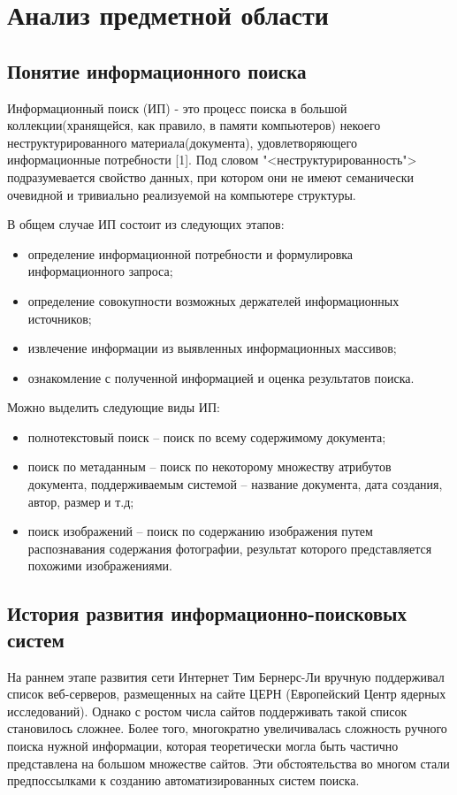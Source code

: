 \section{Анализ предметной области}
\subsection{Понятие информационного поиска}

Информационный поиск (ИП) - это процесс поиска в большой коллекции(хранящейся, как правило, в памяти компьютеров) некоего неструктурированного материала(документа), удовлетворяющего информационные потребности [1]. Под словом "<неструктурированность"> подразумевается свойство данных, при котором они не имеют семанически очевидной и тривиально реализуемой на компьютере структуры.

В общем случае ИП состоит из следующих этапов:
\begin{itemize}
\item определение информационной потребности и формулировка информационного запроса;
\item определение совокупности возможных держателей информационных источников;
\item извлечение информации из выявленных информационных массивов;
\item ознакомление с полученной информацией и оценка результатов поиска.
\end{itemize}

Можно выделить следующие виды ИП:
\begin{itemize}
\item полнотекстовый поиск -- поиск по всему содержимому документа;
\item поиск по метаданным -- поиск по некоторому множеству атрибутов документа, поддерживаемым системой -- название документа, дата создания, автор, размер и т.д;
\item поиск изображений -- поиск по содержанию изображения путем распознавания содержания фотографии, результат которого представляется похожими изображениями.
\end{itemize}
 
\subsection{История развития информационно-поисковых систем}
На раннем этапе развития сети Интернет Тим Бернерс-Ли вручную поддерживал список веб-серверов, размещенных на сайте ЦЕРН (Европейский Центр ядерных исследований). Однако с ростом числа сайтов поддерживать такой список становилось сложнее. Более того, многократно увеличивалась сложность ручного поиска нужной информации, которая теоретически могла быть частично представлена на большом множестве сайтов. Эти обстоятельства во многом стали предпоссылками к созданию автоматизированных систем поиска.

